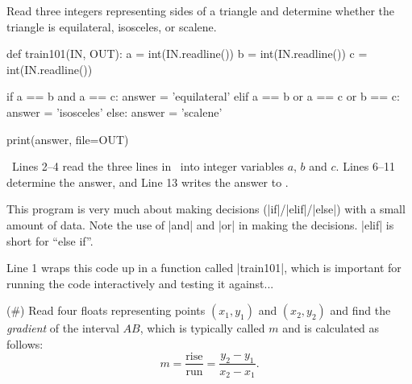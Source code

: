 
\clearpage


\Question Read three integers representing sides of a triangle and
determine whether the triangle is equilateral, isosceles, or scalene.

\Sample

               {}
               {}

\Solution

\begin{pythoncode} 
  def train101(IN, OUT):
    a = int(IN.readline())
    b = int(IN.readline())
    c = int(IN.readline())

    if a == b and a == c:
      answer = 'equilateral'
    elif a == b or a == c or b == c:
      answer = 'isosceles'
    else:
      answer = 'scalene'

    print(answer, file=OUT)
\end{pythoncode}

\Explanation\ Lines 2--4 read the three lines in \IN\ into integer variables $a$, $b$ and
$c$. Lines 6--11 determine the answer, and Line 13 writes the answer to \OUT.

This program is very much about making decisions (\pycode|if|/\pycode|elif|/\pycode|else|)
with a small amount of data. Note the use of \pycode|and| and \pycode|or| in making the
decisions. \pycode|elif| is short for ``else if''.

Line 1 wraps this code up in a function called \pycode|train101|, which is important for
running the code interactively and testing it against...



\clearpage


\Question (\#\theproblemnumber) Read four floats representing points $(x_1,y_1)$ and
$(x_2,y_2)$ and find the \emph{gradient} of the interval $AB$, which is typically called
$m$ and is calculated as follows:
\[ m = \frac{\mathrm{rise}}{\mathrm{run}} = \frac{y_2 - y_1}{x_2 - x_1}.\]


